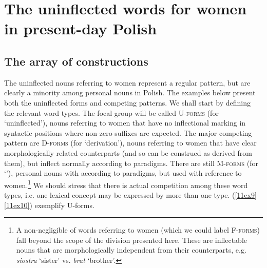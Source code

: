 \documentclass[output=paper,colorlinks,citecolor=brown]{langscibook}
\begin{document}
\section{The uninflected words for women in present-day Polish} \label{11sec3}

\subsection{The array of constructions} \label{11sec3.1}

The uninflected nouns referring to women represent a regular pattern, but are clearly a minority among  personal nouns in Polish. The examples below present both the uninflected forms and competing patterns. We shall start by defining the relevant word types. The focal group will be called \textsc{U-forms} (for `uninflected'), nouns referring to women that have no inflectional marking in syntactic positions where non-zero suffixes are expected. The major competing pattern are \textsc{D-forms} (for `derivation'), nouns referring to women that have clear morphologically related  counterparts (and so can be construed as derived from them), but inflect normally according to  paradigms. There are still \textsc{M-forms} (for `'),  personal nouns with  according to  paradigms, but used with reference to women.\footnote{A non-negligible  of words referring to women (which we could label \textsc{F-forms}) fall beyond the scope of the division presented here. These are inflectable  nouns that are morphologically independent from their  counterparts, e.g. \emph{siostra} `sister' vs. \emph{brat} `brother'.} We should stress that there is actual competition among these word types, i.e. one lexical concept may be expressed by more than one type. (\ref{11ex9}--\ref{11ex10}) exemplify U-forms.
\end{document}
